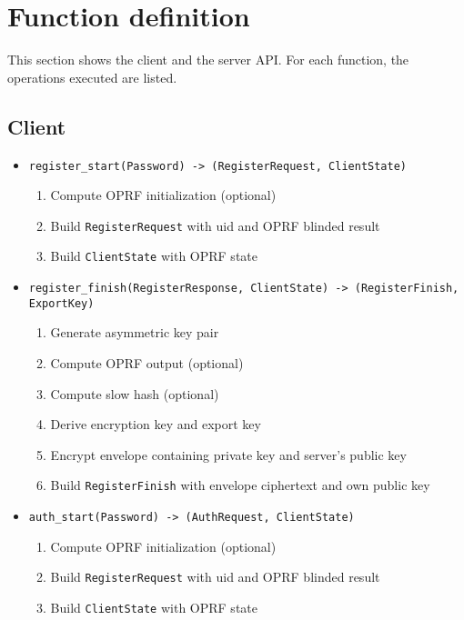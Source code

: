 \documentclass[../report.tex]{subfiles}
\begin{document}
\section{Function definition} \label{sec:impl_function_def}

This section shows the client and the server API.
For each function, the operations executed are listed.


\subsection{Client}
\begin{itemize}
 \item \verb|register_start(Password) -> (RegisterRequest, ClientState)|
  \begin{enumerate}
    \item Compute OPRF initialization (optional)
    \item Build \verb|RegisterRequest| with uid and OPRF blinded result
    \item Build \verb|ClientState| with OPRF state
  \end{enumerate}
  
 \item \verb|register_finish(RegisterResponse, ClientState) -> (RegisterFinish, ExportKey)|
  \begin{enumerate}
    \item Generate asymmetric key pair
    \item Compute OPRF output (optional)
    \item Compute slow hash (optional)
    \item Derive encryption key and export key
    \item Encrypt envelope containing private key and server's public key
    \item Build \verb|RegisterFinish| with envelope ciphertext and own public key
  \end{enumerate}
 
 
 
 \item \verb|auth_start(Password) -> (AuthRequest, ClientState)|
   \begin{enumerate}
    \item Compute OPRF initialization (optional)
    \item Build \verb|RegisterRequest| with uid and OPRF blinded result
    \item Build \verb|ClientState| with OPRF state
  \end{enumerate}
  

\end{itemize}
\end{document}
